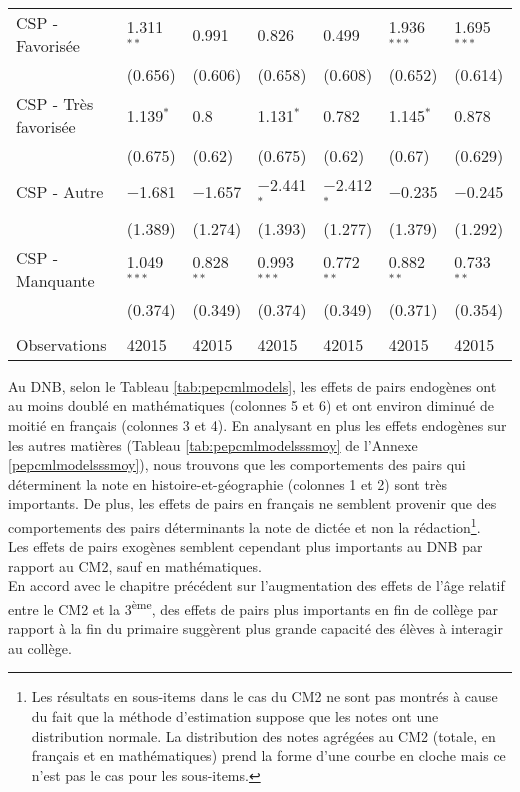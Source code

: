 \documentclass[
]{book}
\begin{document}
\begin{ThreePartTable}
\begin{longtable}[t]{lllllll}
\hspace{1em}CSP - Favorisée & 1.311$^{**}$ & 0.991 & 0.826 & 0.499 & 1.936$^{***}$ & 1.695$^{***}$\\
\hspace{1em} & (0.656) & (0.606) & (0.658) & (0.608) & (0.652) & (0.614)\\
\hspace{1em}CSP - Très favorisée & 1.139$^{*}$ & 0.8 & 1.131$^{*}$ & 0.782 & 1.145$^{*}$ & 0.878\\
\hspace{1em} & (0.675) & (0.62) & (0.675) & (0.62) & (0.67) & (0.629)\\
\hspace{1em}CSP - Autre & $-$1.681 & $-$1.657 & $-$2.441$^{*}$ & $-$2.412$^{*}$ & $-$0.235 & $-$0.245\\
\hspace{1em} & (1.389) & (1.274) & (1.393) & (1.277) & (1.379) & (1.292)\\
\hspace{1em}CSP - Manquante & 1.049$^{***}$ & 0.828$^{**}$ & 0.993$^{***}$ & 0.772$^{**}$ & 0.882$^{**}$ & 0.733$^{**}$\\
\hspace{1em} & (0.374) & (0.349) & (0.374) & (0.349) & (0.371) & (0.354)\\
 &  &  &  &  &  & \\
Observations & 42015 & 42015 & 42015 & 42015 & 42015 & 42015\\*
\end{longtable}
\end{ThreePartTable}
\endgroup{}

\quad Au DNB, selon le Tableau \ref{tab:pepcmlmodels}, les effets de pairs endogènes ont au moins doublé en mathématiques (colonnes 5 et 6) et ont environ diminué de moitié en français (colonnes 3 et 4). En analysant en plus les effets endogènes sur les autres matières (Tableau \ref{tab:pepcmlmodelsssmoy} de l'Annexe \ref{pepcmlmodelsssmoy}), nous trouvons que les comportements des pairs qui déterminent la note en histoire-et-géographie (colonnes 1 et 2) sont très importants. De plus, les effets de pairs en français ne semblent provenir que des comportements des pairs déterminants la note de dictée et non la rédaction\footnote{Les résultats en sous-items dans le cas du CM2 ne sont pas montrés à cause du fait que la méthode d'estimation suppose que les notes ont une distribution normale. La distribution des notes agrégées au CM2 (totale, en français et en mathématiques) prend la forme d'une courbe en cloche mais ce n'est pas le cas pour les sous-items.}.\\
Les effets de pairs exogènes semblent cependant plus importants au DNB par rapport au CM2, sauf en mathématiques.\\
En accord avec le chapitre précédent sur l'augmentation des effets de l'âge relatif entre le CM2 et la 3\textsuperscript{ème}, des effets de pairs plus importants en fin de collège par rapport à la fin du primaire suggèrent plus grande capacité des élèves à interagir au collège.
\end{document}
